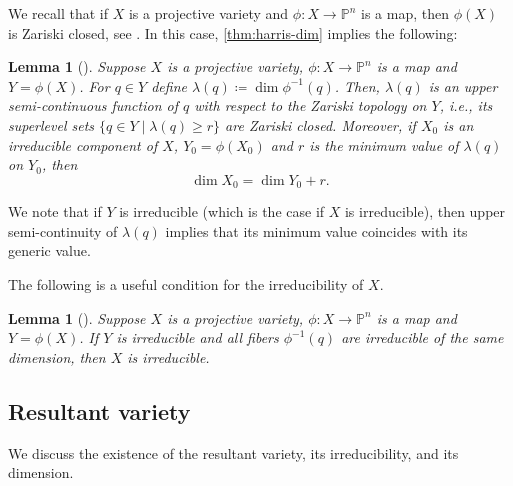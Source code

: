 \documentclass[11pt,a4paper]{article}
\newtheorem{lemma}[theorem]{Lemma}\AddToHook{env/lemma/begin}{\crefalias{theorem}{lemma}}
\numberwithin{equation}{section}
\newcommand{\PP}{\mathbb{P}}
\begin{document}
We recall that if $X$ is a projective variety and $\phi:X\rightarrow\PP^{n}$ is a map, then $\phi(X)$ is Zariski closed, see \cite[Theorem~3.12]{Harris-93}. 
In this case, \cref{thm:harris-dim} implies the following:
\begin{lemma}[{\cite[Corollary~11.13]{Harris-93}}]
\label{lem:dimension}
    Suppose $X$ is a projective variety, $\phi:X\rightarrow\PP^{n}$ is a map and $Y=\phi(X)$.
    For $q\in Y$ define $\lambda(q)\coloneqq \dim\phi^{-1}(q)$.
    Then, $\lambda(q)$ is an upper semi-continuous function of $q$ with respect to the Zariski topology on $Y$, i.e., its superlevel sets $\{q\in Y\mid \lambda(q)\geq r\}$ are Zariski closed.
    Moreover, if $X_0$ is an irreducible component of $X$, $Y_0=\phi(X_0)$ and $r$ is the minimum value of $\lambda(q)$ on $Y_0$, then \[
    \dim X_0 = \dim Y_0 + r.
    \]
\end{lemma}
\noindent
We note that if $Y$ is irreducible (which is the case if $X$ is irreducible), then upper semi-continuity of $\lambda(q)$ implies that its minimum value coincides with its generic value.

The following is a useful condition for the irreducibility of $X$.
\begin{lemma}[{\cite[Corollary~11.14]{Harris-93}}]
\label{lem:irred}
Suppose $X$ is a projective variety, $\phi:X\rightarrow \PP^n$ is a map and $Y=\phi(X)$.
    If $Y$ is irreducible and all fibers $\phi^{-1}(q)$ are irreducible of the same dimension, then $X$ is irreducible.
\end{lemma}

\subsection{Resultant variety}
We discuss the existence of the resultant variety, its irreducibility, and  its dimension.
\end{document}
